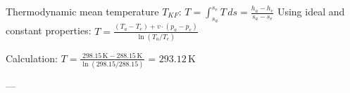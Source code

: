 Thermodynamic mean temperature \( T_{KF} \):  
\( T = \int_{s_a}^{s_e} T \, ds = \frac{h_a - h_e}{s_a - s_e} \)  
Using ideal and constant properties:  
\( T = \frac{(T_a - T_e) + v \cdot (p_a - p_e)}{\ln(T_a / T_e)} \)  

Calculation:  
\( T = \frac{298.15 \, \text{K} - 288.15 \, \text{K}}{\ln(298.15 / 288.15)} \)  
= \( 293.12 \, \text{K} \)  

---